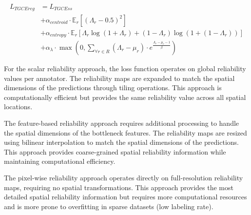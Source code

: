 \begin{align}
  L_{TGCEreg} &= L_{TGCEss} \\
  &+\alpha_{centroid} \cdot \mathbb{E}_r[(\Lambda_r - 0.5)^2] \nonumber \\
  &+\alpha_{entropy} \cdot \mathbb{E}_r[\Lambda_r \log(1 + \Lambda_r)
  +(1 - \Lambda_r) \log(1 + (1 - \Lambda_r))] \nonumber \\
  &+\alpha_{\lambda} \cdot \max \left(0, \sum_{\forall r \in R}
    \left(\Lambda_r - \mu_r\right) \cdot
  e^{\frac{\Lambda_r - \mu_r - 1}{\beta}}\right) \nonumber
\end{align}

For the scalar reliability approach, the loss function operates on
global reliability values per annotator. The reliability maps are
expanded to match the spatial dimensions of the predictions through
tiling operations. This approach is computationally efficient but
provides the same reliability value across all spatial locations.

The feature-based reliability approach requires additional processing
to handle the spatial dimensions of the bottleneck features. The
reliability maps are resized using bilinear interpolation to match
the spatial dimensions of the predictions. This approach provides
coarse-grained spatial reliability information while maintaining
computational efficiency.

The pixel-wise reliability approach operates directly on full-resolution
reliability maps, requiring no spatial transformations. This approach
provides the most detailed spatial reliability information but requires
more computational resources and is more prone to overfitting in
sparse datasets (low labeling rate).
